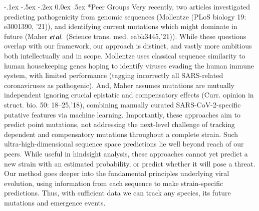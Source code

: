 \documentclass[onecolumn, compsoc,12pt]{IEEEtran}
\makeatletter
\renewcommand\paragraph{\@startsection {section}{1}{\z@}%
                                   {-.1ex \@plus -.5ex \@minus -.2ex}%
                                   {0.0ex \@plus.5ex}%
                                   {\fontsize{11}{10}\selectfont\bfseries\itshape\sffamily\color{black}}}
\def\hcov{SARS-CoV-2\xspace}
\makeatother
\begin{document}
\paragraph*{Peer Groups} Very recently, two articles investigated predicting pathogenicity  from genomic sequences (Mollentze (PLoS biology 19: e3001390, '21)), and identifying current mutations which might dominate in future (Maher $\textit{et} \mspace{3mu} \textit{al.}$ (Science trans. med. eabk3445,'21)). While these questions overlap with our framework,  our approach is distinct, and vastly more ambitious both intellectually and in scope. Mollentze  uses  classical  sequence similarity to  human housekeeping genes hoping to identify viruses  evading the human immune system, with limited   performance (tagging incorrectly all SARS-related coronaviruses as pathogenic). And, Maher assumes mutations are mutually independent ignoring crucial epistatic and compensatory effects (Curr. opinion in struct. bio. 50: 18--25,'18), combining  manually curated \hcov-specific putative features via machine learning. Importantly, these approaches  %
 aim to predict point mutations, not addressing the next-level challenge of tracking dependent and compensatory mutations throughout a complete strain. Such ultra-high-dimensional sequence space predictions  lie well beyond reach of our peers. While useful in hindsight analysis, these approaches cannot yet predict a new strain with an estimated probability, or predict whether it will pose a threat.  Our method goes deeper into the fundamental principles underlying viral evolution, using information from each sequence to make strain-specific predictions. Thus, with sufficient data we can track any species,  its future mutations and emergence events. %
\end{document}
